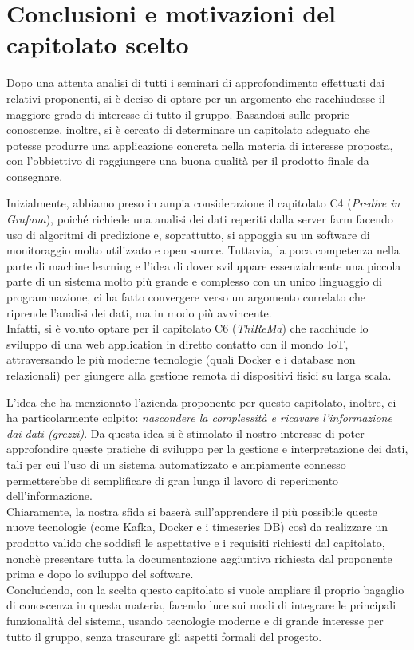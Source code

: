 \section{Conclusioni e motivazioni del capitolato scelto}

Dopo una attenta analisi di tutti i seminari di approfondimento effettuati dai relativi proponenti, si è deciso di optare per un argomento che racchiudesse il maggiore grado di interesse di tutto il gruppo. Basandosi sulle proprie conoscenze, inoltre, si è cercato di determinare un capitolato adeguato che potesse produrre una applicazione concreta nella materia di interesse proposta, con l'obbiettivo di raggiungere una buona qualità per il prodotto finale da consegnare.

Inizialmente, abbiamo preso in ampia considerazione il capitolato C4 (\textit{Predire in Grafana}), poiché richiede una analisi dei dati reperiti dalla server farm facendo uso di algoritmi di predizione e, soprattutto, si appoggia su un software di monitoraggio molto utilizzato e open source. Tuttavia, la poca competenza nella parte di machine learning e l'idea di dover sviluppare essenzialmente una piccola parte di un sistema molto più grande e complesso con un unico linguaggio di programmazione, ci ha fatto convergere verso un argomento correlato che riprende  l'analisi dei dati, ma in modo più avvincente. \\
Infatti, si è voluto optare per il capitolato C6 (\textit{ThiReMa}) che racchiude lo sviluppo di una web application in diretto contatto con il mondo IoT, attraversando le più moderne tecnologie (quali Docker e i database non relazionali) per giungere alla gestione remota di dispositivi fisici su larga scala. 

L'idea che ha menzionato l'azienda proponente per questo capitolato, inoltre, ci ha particolarmente colpito: \textit{nascondere la complessità e ricavare l'informazione dai dati (grezzi)}. Da questa idea si è stimolato il nostro interesse di poter approfondire queste pratiche di sviluppo per la gestione e interpretazione dei dati, tali per cui l'uso di un sistema automatizzato e ampiamente connesso permetterebbe di semplificare di gran lunga il lavoro di reperimento dell'informazione. \\
Chiaramente, la nostra sfida si baserà sull'apprendere il più possibile queste nuove tecnologie (come Kafka, Docker e i timeseries DB) così da realizzare un prodotto valido che soddisfi le aspettative e i requisiti richiesti dal capitolato, nonchè presentare tutta la documentazione aggiuntiva richiesta dal proponente prima e dopo lo sviluppo del software. \\
Concludendo, con la scelta questo capitolato si vuole ampliare il proprio bagaglio di conoscenza in questa materia, facendo luce sui modi di integrare le principali funzionalità del sistema, usando tecnologie moderne e di grande interesse per tutto il gruppo, senza trascurare gli aspetti formali del progetto.

